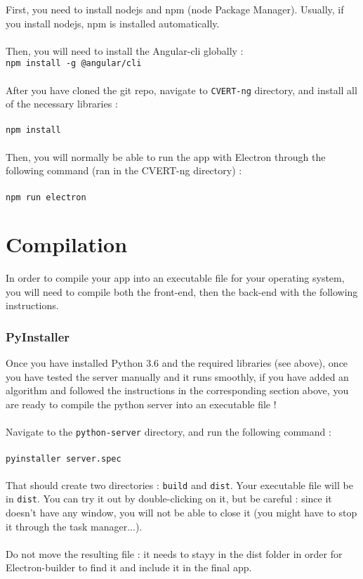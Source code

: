 \documentclass[12pt,a4paper]{article}
\begin{document}
First, you need to install nodejs and npm (node Package Manager). Usually, if you install nodejs, npm is installed automatically.\\
~\\
Then, you will need to install the Angular-cli globally :\\
\texttt{npm install -g @angular/cli}\\
~\\
After you have cloned the git repo, navigate to \texttt{CVERT-ng} directory, and install all of the necessary libraries :\\
~\\
\texttt{npm install}\\
~\\
Then, you will normally be able to run the app with Electron through the following command (ran in the CVERT-ng directory) :\\
~\\
\texttt{npm run electron}

\pagebreak

\part{Compilation}
\setcounter{section}{0}

In order to compile your app into an executable file for your operating system, you will need to compile both the front-end, then the back-end with the following instructions.

\section{PyInstaller}

Once you have installed Python 3.6 and the required libraries (see above), once you have tested the server manually and it runs smoothly, if you have added an algorithm and followed the instructions in the corresponding section above, you are ready to compile the python server into an executable file !\\
~\\
Navigate to the \texttt{python-server} directory, and run the following command :\\
~\\
\texttt{pyinstaller server.spec}\\
~\\
That should create two directories : \texttt{build} and \texttt{dist}. Your executable file will be in \texttt{dist}. You can try it out by double-clicking on it, but be careful : since it doesn't have any window, you will not be able to close it (you might have to stop it through the task manager...).\\
~\\
Do not move the resulting file : it needs to stayy in the dist folder in order for Electron-builder to find it and include it in the final app.
\end{document}
